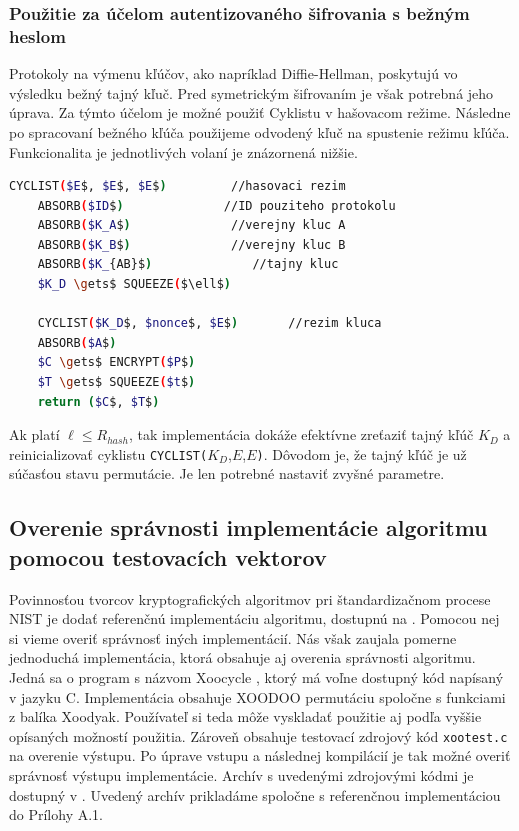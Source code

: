 \subsubsection{Použitie za účelom autentizovaného šifrovania s bežným heslom}
Protokoly na výmenu kľúčov, ako napríklad Diffie-Hellman, poskytujú vo výsledku bežný tajný kľuč. Pred symetrickým šifrovaním je však potrebná jeho úprava. Za týmto účelom je možné použiť Cyklistu v hašovacom režime. Následne po spracovaní bežného kľúča použijeme odvodený kľuč na spustenie režimu kľúča. Funkcionalita je jednotlivých volaní je znázornená nižšie. \newpage
\begin{lstlisting}[language=bash,mathescape=true]
	CYCLIST($E$, $E$, $E$)         //hasovaci rezim
	ABSORB($ID$)              //ID pouziteho protokolu
	ABSORB($K_A$)              //verejny kluc A
	ABSORB($K_B$)              //verejny kluc B 
	ABSORB($K_{AB}$)              //tajny kluc 
	$K_D \gets$ SQUEEZE($\ell$)
	
	CYCLIST($K_D$, $nonce$, $E$)       //rezim kluca
	ABSORB($A$)
	$C \gets$ ENCRYPT($P$)
	$T \gets$ SQUEEZE($t$)
	return ($C$, $T$)
\end{lstlisting} 
Ak platí $\ell \leq R_{hash}$, tak implementácia dokáže efektívne zreťaziť tajný kľúč $K_D$ a reinicializovať cyklistu \lstinline|CYCLIST(|$K_D$,$E$,$E$\lstinline|)|. Dôvodom je, že tajný kľúč je už súčasťou stavu permutácie. Je len potrebné nastaviť zvyšné parametre. 

\subsection{Overenie správnosti implementácie algoritmu pomocou testovacích vektorov}
Povinnosťou tvorcov kryptografických algoritmov pri štandardizačnom procese NIST je dodať referenčnú implementáciu algoritmu, dostupnú na \cite{vektory}. Pomocou nej si vieme overiť správnosť iných implementácií. Nás však zaujala pomerne jednoduchá implementácia, ktorá obsahuje aj overenia správnosti algoritmu. Jedná sa o program s názvom Xoocycle \cite{xootest}, ktorý má voľne dostupný kód napísaný v jazyku C. Implementácia obsahuje XOODOO permutáciu spoločne s funkciami z balíka Xoodyak. Používateľ si teda môže vyskladať použitie aj podľa vyššie opísaných možností použitia. Zároveň obsahuje testovací zdrojový kód \lstinline|xootest.c| na overenie výstupu. Po úprave vstupu a následnej kompilácií je tak možné overiť správnosť výstupu implementácie. Archív s uvedenými zdrojovými kódmi je dostupný v \cite{xootest}. Uvedený archív prikladáme spoločne s referenčnou implementáciou do Prílohy A.1.       